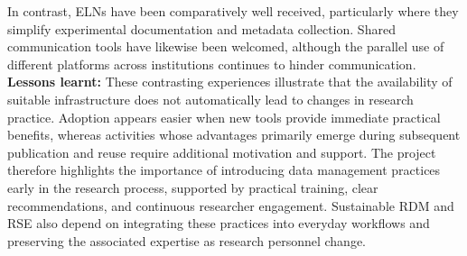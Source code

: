 \documentclass{eceasst}
\begin{document}
In contrast, ELNs have been
comparatively well received, particularly where
they simplify experimental documentation and
metadata collection. Shared communication tools
have likewise been welcomed, although the parallel
use of different platforms across institutions
continues to hinder communication.
\\
\noindent\textbf{Lessons learnt:}
These contrasting experiences illustrate that
the availability of suitable infrastructure does
not automatically lead to changes in research
practice. Adoption appears easier when new tools
provide immediate practical benefits, whereas
activities whose advantages primarily emerge during
subsequent publication and reuse require additional
motivation and support.
The project therefore highlights the importance
of introducing data management practices early
in the research process, supported by practical
training, clear recommendations, and continuous
researcher engagement. Sustainable RDM and RSE
also depend on integrating these practices into
everyday workflows and preserving the associated
expertise as research personnel change.

\end{document}
